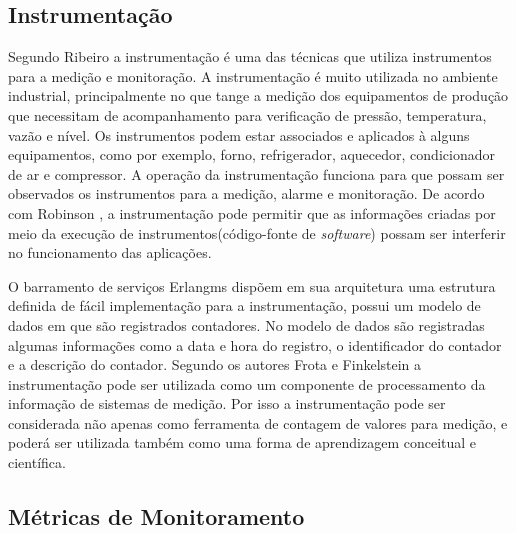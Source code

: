 
\subsection{Instrumentação}
\label{instrumentacao}
Segundo Ribeiro \cite{ribeiro1999instrumentaccao} a instrumentação é uma das técnicas que utiliza instrumentos para a medição e monitoração. A instrumentação é muito utilizada no ambiente industrial, principalmente no que tange a medição dos equipamentos de produção que necessitam de acompanhamento para verificação de pressão, temperatura, vazão e nível. Os instrumentos podem estar associados e
aplicados à alguns equipamentos, como por exemplo, forno, refrigerador,
aquecedor, condicionador de ar e compressor. A operação da instrumentação funciona para que possam ser observados os instrumentos para a medição, alarme e monitoração. De acordo com Robinson \cite{robinson2002monitoring}, a instrumentação pode permitir que as informações criadas por meio da execução de instrumentos(código-fonte de \textit{software}) possam ser interferir no funcionamento das aplicações.

O barramento de serviços Erlangms dispõem em sua arquitetura uma estrutura definida de fácil implementação para a instrumentação, possui um modelo de dados em que são registrados contadores. No modelo de dados são registradas algumas informações como a data e hora do registro, o identificador do contador e a descrição do contador.  
Segundo os autores Frota e Finkelstein \cite{frota2008educaccao} a instrumentação pode ser utilizada como um componente de processamento da informação de sistemas de medição. Por isso a instrumentação pode ser considerada não apenas como ferramenta de contagem de valores para medição, e poderá ser utilizada também como uma forma de aprendizagem conceitual e científica.  


\subsection{Métricas de Monitoramento}

